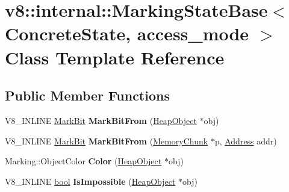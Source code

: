 \hypertarget{classv8_1_1internal_1_1MarkingStateBase}{}\section{v8\+:\+:internal\+:\+:Marking\+State\+Base$<$ Concrete\+State, access\+\_\+mode $>$ Class Template Reference}
\label{classv8_1_1internal_1_1MarkingStateBase}
\subsection*{Public Member Functions}
\begin{DoxyCompactItemize}
\item 
\mbox{\label{classv8_1_1internal_1_1MarkingStateBase_ae6c858f49093fa151c284f96a3e55fcb}} 
V8\+\_\+\+I\+N\+L\+I\+NE \mbox{\hyperlink{classv8_1_1internal_1_1MarkBit}{Mark\+Bit}} {\bfseries Mark\+Bit\+From} (\mbox{\hyperlink{classv8_1_1internal_1_1HeapObject}{Heap\+Object}} $\ast$obj)
\item 
\mbox{\label{classv8_1_1internal_1_1MarkingStateBase_aa6b7ba8d66f67ca7486ed72f19b76f01}} 
V8\+\_\+\+I\+N\+L\+I\+NE \mbox{\hyperlink{classv8_1_1internal_1_1MarkBit}{Mark\+Bit}} {\bfseries Mark\+Bit\+From} (\mbox{\hyperlink{classv8_1_1internal_1_1MemoryChunk}{Memory\+Chunk}} $\ast$p, \mbox{\hyperlink{classuintptr__t}{Address}} addr)
\item 
\mbox{\label{classv8_1_1internal_1_1MarkingStateBase_a75f45788e8339b41202871272703fd9b}} 
Marking\+::\+Object\+Color {\bfseries Color} (\mbox{\hyperlink{classv8_1_1internal_1_1HeapObject}{Heap\+Object}} $\ast$obj)
\item 
\mbox{\label{classv8_1_1internal_1_1MarkingStateBase_ab607d2d135455f3d1c14554b727cdd7d}} 
V8\+\_\+\+I\+N\+L\+I\+NE \mbox{\hyperlink{classbool}{bool}} {\bfseries Is\+Impossible} (\mbox{\hyperlink{classv8_1_1internal_1_1HeapObject}{Heap\+Object}} $\ast$obj)
\item 
\mbox{\label{classv8_1_1internal_1_1MarkingStateBase_a113b445c380670485d92a86324a03255}} 

\end{DoxyCompactItemize}
